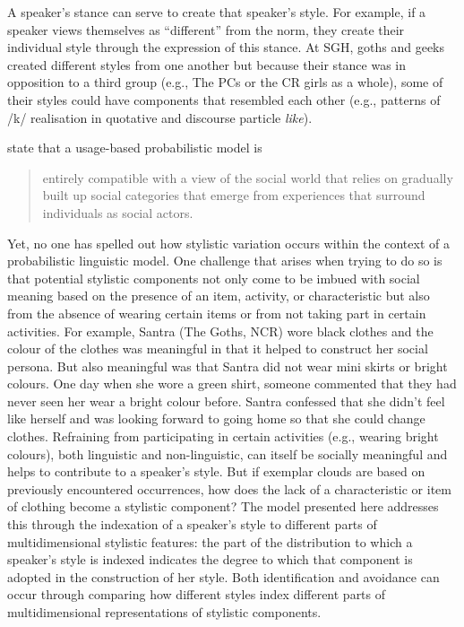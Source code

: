 A speaker's stance can serve to create that speaker's style.  For example, if a speaker views themselves as ``different'' from the norm, they create their indivi\-dual style through the expression of this stance.  At SGH, goths and geeks created different styles from one another but because their stance was in opposition to a third group (e.g., The PCs or the CR girls as a whole), some of their styles could have components that resembled each other (e.g., patterns of /k/ realisation in quotative and discourse particle \textit{like}).

\citet{mendozadentonetal2003} state that a usage-based probabilistic model is

\begin{quote}
entirely compatible with a view of the social world that relies on gradually built up social categories that emerge from experiences that surround individuals as social actors. \citep[136]{mendozadentonetal2003}
\end{quote}

\noindent Yet, no one has spelled out how stylistic variation occurs within the context of a probabilistic linguistic model.  One challenge that arises when trying to do so is that potential stylistic components not only come to be imbued with social meaning based on the presence of an item, activity, or characteristic but also from the absence of wearing certain items or from not taking part in certain activities.  For example, Santra (The Goths, NCR) wore black clothes and the colour of the clothes was meaningful in that it helped to construct her social persona.  But also meaningful was that Santra did not wear mini skirts or bright colours.  One day when she wore a green shirt, someone commented that they had never seen her wear a bright colour before.  Santra confessed that she didn't feel like herself and was looking forward to going home so that she could change clothes.  Refraining from participating in certain activities (e.g., wearing bright colours), both linguistic and non-linguistic, can itself be socially meaningful and helps to contribute to a speaker's style.  But if exemplar clouds are based on previously encountered occurrences, how does the lack of a characteristic or item of clothing become a stylistic component?  The model presented here addresses this through the indexation of a speaker's style to different parts of multidimensional stylistic features: the part of the distribution to which a speaker's style is indexed indicates the degree to which that component is adopted in the construction of her style.  Both identification and avoidance can occur through comparing how different styles index different parts of multidimensional representations of stylistic components.


